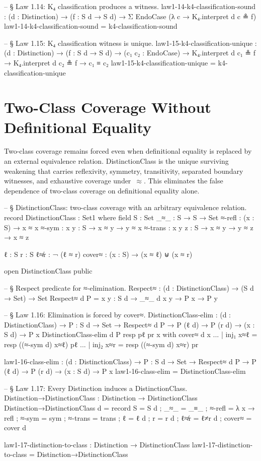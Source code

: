 \documentclass[11pt,a4paper]{book}
\def\texttt#1{#1}%
\begin{document}
\begin{code}
-- § Law 1.14: K₄ classification produces a witness.
law1-14-k4-classification-sound :
  (d : Distinction) →
  (f : S d → S d) →
  Σ EndoCase (λ c → K₄.interpret d c ≗ f)
law1-14-k4-classification-sound = k4-classification-sound

-- § Law 1.15: K₄ classification witness is unique.
law1-15-k4-classification-unique :
  (d : Distinction) →
  (f : S d → S d) →
  (c₁ c₂ : EndoCase) →
  K₄.interpret d c₁ ≗ f →
  K₄.interpret d c₂ ≗ f →
  c₁ ≡ c₂
law1-15-k4-classification-unique = k4-classification-unique
\end{code}

\section{Two-Class Coverage Without Definitional Equality}

Two-class coverage remains forced even when definitional equality is replaced by an external equivalence relation.
\texttt{DistinctionClass} is the unique surviving weakening that carries reflexivity, symmetry, transitivity, separated boundary witnesses, and exhaustive coverage under~$\approx$.
This eliminates the false dependence of two-class coverage on definitional equality alone.

\begin{code}
-- § DistinctionClass: two-class coverage with an arbitrary equivalence relation.
record DistinctionClass : Set1 where
  field
    S      : Set
    _≈_    : S → S → Set
    ≈-refl : (x : S) → x ≈ x
    ≈-sym  : {x y : S} → x ≈ y → y ≈ x
    ≈-trans : {x y z : S} → x ≈ y → y ≈ z → x ≈ z

    ℓ      : S
    r      : S
    ℓ≉r    : ¬ (ℓ ≈ r)
    cover≈ : (x : S) → (x ≈ ℓ) ⊎ (x ≈ r)

open DistinctionClass public

-- § Respect predicate for ≈-elimination.
Respect≈ : (d : DistinctionClass) → (S d → Set) → Set
Respect≈ d P = {x y : S d} → _≈_ d x y → P x → P y

-- § Law 1.16: Elimination is forced by cover≈.
DistinctionClass-elim :
  (d : DistinctionClass) →
  {P : S d → Set} →
  Respect≈ d P →
  P (ℓ d) →
  P (r d) →
  (x : S d) →
  P x
DistinctionClass-elim d {P} resp pℓ pr x with cover≈ d x
... | inj₁ x≈ℓ = resp ((≈-sym d) x≈ℓ) pℓ
... | inj₂ x≈r = resp ((≈-sym d) x≈r) pr

law1-16-class-elim :
  (d : DistinctionClass) →
  {P : S d → Set} →
  Respect≈ d P →
  P (ℓ d) →
  P (r d) →
  (x : S d) →
  P x
law1-16-class-elim = DistinctionClass-elim

-- § Law 1.17: Every Distinction induces a DistinctionClass.
Distinction→DistinctionClass : Distinction → DistinctionClass
Distinction→DistinctionClass d = record
  { S       = S d
  ; _≈_     = _≡_
  ; ≈-refl  = λ x → refl
  ; ≈-sym   = sym
  ; ≈-trans = trans
  ; ℓ       = ℓ d
  ; r       = r d
  ; ℓ≉r     = ℓ≠r d
  ; cover≈  = cover d
  }

law1-17-distinction-to-class : Distinction → DistinctionClass
law1-17-distinction-to-class = Distinction→DistinctionClass
\end{code}
\end{document}
